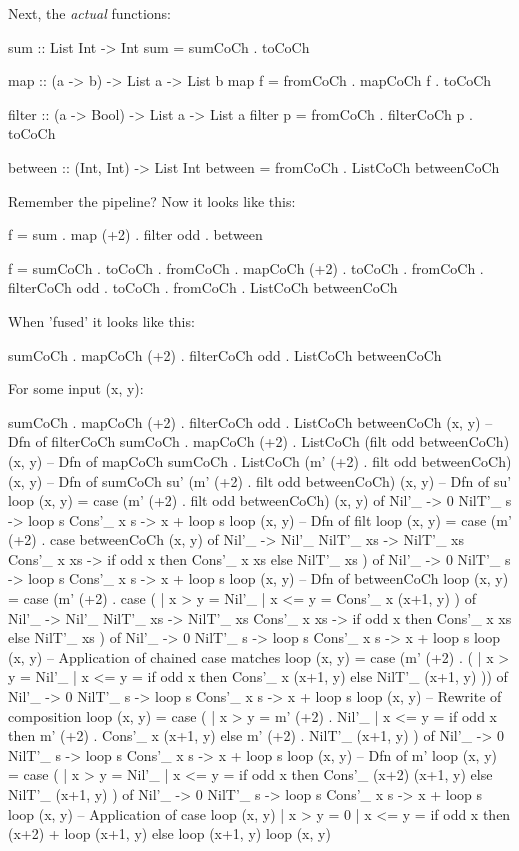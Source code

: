 Next, the \textit{actual} functions:
\begin{code}
sum :: List Int -> Int
sum = sumCoCh . toCoCh

map :: (a -> b) -> List a -> List b
map f = fromCoCh . mapCoCh f . toCoCh

filter :: (a -> Bool) -> List a -> List a
filter p = fromCoCh . filterCoCh p . toCoCh

between :: (Int, Int) -> List Int
between = fromCoCh . ListCoCh betweenCoCh
\end{code}
Remember the pipeline? Now it looks like this:
\begin{code}
f = sum . map (+2) . filter odd . between

f =	     sumCoCh          . toCoCh .
fromCoCh . mapCoCh (+2)   . toCoCh .
fromCoCh . filterCoCh odd . toCoCh .
fromCoCh . ListCoCh betweenCoCh
\end{code}
When 'fused' it looks like this:
\begin{code}
sumCoCh . mapCoCh (+2) . filterCoCh odd . ListCoCh betweenCoCh
\end{code}
For some input (x, y):
\begin{code}
sumCoCh . mapCoCh (+2) . filterCoCh odd . ListCoCh betweenCoCh (x, y)
-- Dfn of filterCoCh
sumCoCh . mapCoCh (+2) . ListCoCh (filt odd betweenCoCh) (x, y)
-- Dfn of mapCoCh
sumCoCh . ListCoCh (m' (+2) . filt odd betweenCoCh) (x, y)
-- Dfn of sumCoCh
su' (m' (+2) . filt odd betweenCoCh) (x, y)
-- Dfn of su'
loop (x, y) = case (m' (+2) . filt odd betweenCoCh) (x, y) of
  Nil'_ -> 0
  NilT'_ s -> loop s
  Cons'_ x s -> x + loop s
loop (x, y)
-- Dfn of filt
loop (x, y) = case (m' (+2) . case betweenCoCh (x, y) of 
  Nil'_ -> Nil'_
  NilT'_ xs -> NilT'_ xs
  Cons'_ x xs -> if odd x then Cons'_ x xs else NilT'_ xs
  ) of
  Nil'_ -> 0
  NilT'_ s -> loop s
  Cons'_ x s -> x + loop s
loop (x, y)
-- Dfn of betweenCoCh
loop (x, y) = case (m' (+2) . case (
  | x > y = Nil'_
  | x <= y = Cons'_ x (x+1, y)
  ) of 
  Nil'_ -> Nil'_
  NilT'_ xs -> NilT'_ xs
  Cons'_ x xs -> if odd x then Cons'_ x xs else NilT'_ xs
  ) of
  Nil'_ -> 0
  NilT'_ s -> loop s
  Cons'_ x s -> x + loop s
loop (x, y)
-- Application of chained case matches
loop (x, y) = case (m' (+2) . (
  | x > y = Nil'_
  | x <= y = if odd x then Cons'_ x (x+1, y) else NilT'_ (x+1, y)
  )) of
  Nil'_ -> 0
  NilT'_ s -> loop s
  Cons'_ x s -> x + loop s
loop (x, y)
-- Rewrite of composition
loop (x, y) = case (
  | x > y = m' (+2) . Nil'_
  | x <= y = if odd x
             then m' (+2) . Cons'_ x (x+1, y)
			 else m' (+2) . NilT'_ (x+1, y)
  ) of
  Nil'_ -> 0
  NilT'_ s -> loop s
  Cons'_ x s -> x + loop s
loop (x, y)
-- Dfn of m'
loop (x, y) = case (
  | x > y = Nil'_
  | x <= y = if odd x
             then Cons'_ (x+2) (x+1, y)
             else NilT'_ (x+1, y)
  ) of
  Nil'_ -> 0
  NilT'_ s -> loop s
  Cons'_ x s -> x + loop s
loop (x, y)
-- Application of case
loop (x, y)
  | x > y = 0
  | x <= y = if odd x
             then (x+2) + loop (x+1, y)
             else loop (x+1, y)
loop (x, y)
\end{code}
